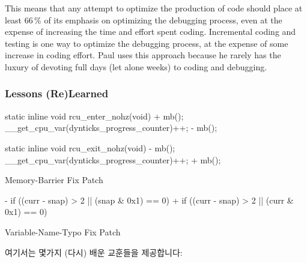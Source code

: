 {	This means that any attempt to optimize the production of code should
	place at least 66\,\% of its emphasis on optimizing the debugging process,
	even at the expense of increasing the time and effort spent coding.
	Incremental coding and testing is one way to optimize the debugging
	process, at the expense of some increase in coding effort.
	Paul uses this approach because he rarely has the luxury of
	devoting full days (let alone weeks) to coding and debugging.
	\fi
} \QuickQuizEnd

\subsubsection{Lessons (Re)Learned}
\label{sec:formal:Lessons (Re)Learned}

\begin{listing}[tbp]
{ \scriptsize
\begin{verbbox}
 static inline void rcu_enter_nohz(void)
 {
+       mb();
        __get_cpu_var(dynticks_progress_counter)++;
-       mb();
 }

 static inline void rcu_exit_nohz(void)
 {
-       mb();
        __get_cpu_var(dynticks_progress_counter)++;
+       mb();
 }
\end{verbbox}
}
\centering
\theverbbox
\caption{Memory-Barrier Fix Patch}
\label{lst:formal:Memory-Barrier Fix Patch}
\end{listing}

\begin{listing}[tbp]
{ \scriptsize
\begin{verbbox}
-       if ((curr - snap) > 2 || (snap & 0x1) == 0)
+       if ((curr - snap) > 2 || (curr & 0x1) == 0)
\end{verbbox}
}
\centering
\theverbbox
\caption{Variable-Name-Typo Fix Patch}
\label{lst:formal:Variable-Name-Typo Fix Patch}
\end{listing}

여기서는 몇가지 (다시) 배운 교훈들을 제공합니다:
\iffalse

This effort provided some lessons (re)learned:
\fi

